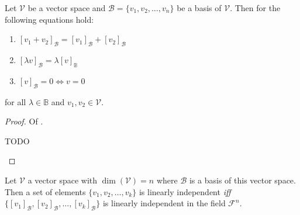 \begin{thm}\label{thm-coordinate-vector-properties}
	Let $\mathcal{V}$ be a vector space and $\mathcal{B}=\{v_1,v_2,\dots,v_n\}$
	be a basis of $\mathcal{V}$. Then for the following equations hold:
	\begin{enumerate}
		\item $[v_1+v_2]_\mathcal{B}=[v_1]_\mathcal{B}+[v_2]_\mathcal{B}$
		\item $[\lambda v]_\mathcal{B}=\lambda[v]_\mathbb{B}$
		\item $[v]_\mathcal{B}=0 \Leftrightarrow v=0$
	\end{enumerate}
	for all $\lambda\in\mathbb{B}$ and $v_1,v_2\in\mathcal{V}$.
\end{thm}

\begin{proof}
	Of .
	\begin{flushleft}
		TODO
	\end{flushleft}
\end{proof}

\begin{thm}\label{thm-vector-coordinates-linear-independence}
	Let $\mathcal{V}$ a vector space with $\dim(\mathcal{V})=n$ where $\mathcal{B}$
	is a basis of this vector space. Then a set of elements $\{v_1,v_2,\dots,v_k\}$
	is linearly independent \textit{iff}
	$\{[v_1]_\mathcal{B},[v_2]_\mathcal{B},\dots,[v_k]_\mathcal{B}\}$ is linearly
	independent in the field $\mathcal{F}^n$.
\end{thm}

